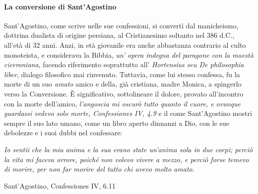 \documentclass[a4paper,12pt]{report}
\begin{document}
\paragraph{La conversione di Sant'Agostino}
Sant’Agostino, come scrive nelle sue confessioni, si convertì dal manicheismo, dottrina dualista di origine persiana, al Cristianesimo soltanto nel 386 d.C., all’età di 32 anni. Anzi, in età giovanile era anche abbastanza contrario al culto monoteista, e considerava la Bibbia, \textit{un’ opera indegna del paragone con la maestà ciceroniana}, facendo  riferimento soprattutto all’ \textit{Hortensius seu De philosophia liber}, dialogo filosofico mai rinvenuto. Tuttavia, come lui stesso confessa, fu la morte di un suo \textit{amato} amico e della, già cristiana, madre Monica, a spingerlo verso la Conversione. È significativo, sottolineare il dolore, provato all’incontro con la morte dell’amico, \textit{l’angoscia mi oscurò tutto quanto il cuore, e ovunque guardassi vedevo solo morte, Confessiones IV, 4.9} e il come Sant’Agostino mostri sempre il suo lato umano, come un libro aperto dinnanzi a Dio, con le sue debolezze e i suoi dubbi nel confessare:

\setlength{\epigraphwidth}{0.8\textwidth}
\epigraph{\textit{Io sentii che la mia anima e la sua erano state un’anima sola in due corpi; perciò la
vita mi faceva orrore, poiché non volevo vivere a mezzo, e perciò forse temevo di morire, per non
far morire del tutto chi avevo molto amato.}}{Sant'Agostino, Confessiones IV, 6.11}
\end{document}

